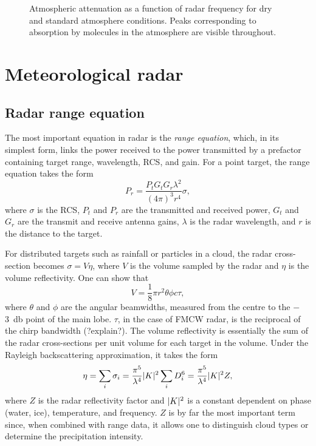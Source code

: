 \documentclass{article}
\DeclarePairedDelimiter\abs{\lvert}{\rvert}%
\begin{document}
\begin{figure}
\begin{minipage}{0.48\textwidth}
		\caption{Atmospheric attenuation as a function of radar frequency for dry and standard atmosphere conditions.\supercite{ITURAttenuation} Peaks corresponding to absorption by molecules in the atmosphere are visible throughout.}
		\label{fig:Attenuation}
	\end{minipage}
\end{figure}

\section{Meteorological radar}

\subsection{Radar range equation}
The most important equation in radar is the \textit{range equation}, which, in its simplest form, links the power received to the power transmitted by a prefactor containing target range, wavelength, RCS, and gain. For a point target, the range equation takes the form
\begin{equation}
	P_r = \frac{P_t G_t G_r \lambda^2}{(4 \pi)^3 r^4} \sigma, \label{eqn:PointTarget}
\end{equation}
where \(\sigma\) is the RCS, \(P_t\) and \(P_r\) are the transmitted and received power, \(G_t\) and \(G_r\) are the transmit and receive antenna gains, \(\lambda\) is the radar wavelength, and \(r\) is the distance to the target.

For distributed targets such as rainfall or particles in a cloud, the radar cross-section becomes \(\sigma = V\eta\), where \(V\) is the volume sampled by the radar and \(\eta\) is the volume reflectivity.
One can show that\supercite{RadarHandbookMeteo}
\begin{equation}
	V = \frac{1}{8} \pi r^2 \theta \phi c \tau,
\end{equation}
where \(\theta\) and \(\phi\) are the angular beamwidths, measured from the centre to the \(-\)\SI{3}{\decibel} point of the main lobe. \(\tau\), in the case of FMCW radar, is the reciprocal of the chirp bandwidth (?explain?).
The volume reflectivity is essentially the sum of the radar cross-sections per unit volume for each target in the volume. Under the Rayleigh backscattering approximation, it takes the form\supercite{RadarMeteorology}
\begin{equation}
	\eta = \sum_i{\sigma_i} = \frac{\pi^5}{\lambda^4} \abs{K}^2 \sum_i{D_i^6} = \frac{\pi^5}{\lambda^4} \abs{K}^2 Z,
\end{equation}
where \(Z\) is the radar reflectivity factor and \(\abs{K}^2\) is a constant dependent on phase (water, ice), temperature, and frequency. \(Z\) is by far the most important term since, when combined with range data, it allows one to distinguish cloud types or determine the precipitation intensity.
\end{document}
